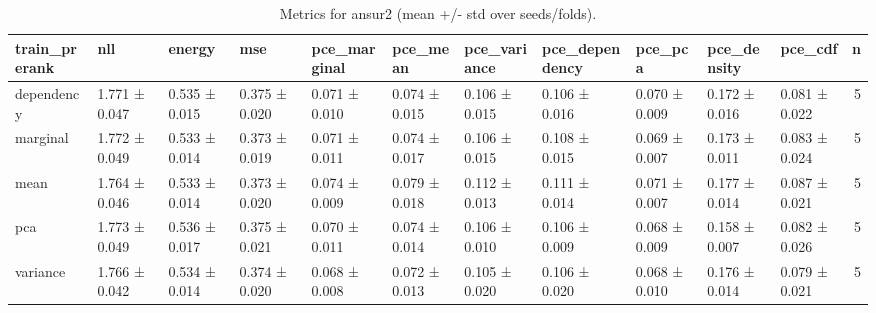 \begin{table}
\caption{Metrics for ansur2 (mean +/- std over seeds/folds).}
\label{tab:metrics_summary_ansur2}
\begin{tabular}{lllllllllllr}
\toprule
train_prerank & nll & energy & mse & pce_marginal & pce_mean & pce_variance & pce_dependency & pce_pca & pce_density & pce_cdf & n \\
\midrule
dependency & 1.771 ± 0.047 & 0.535 ± 0.015 & 0.375 ± 0.020 & 0.071 ± 0.010 & 0.074 ± 0.015 & 0.106 ± 0.015 & 0.106 ± 0.016 & 0.070 ± 0.009 & 0.172 ± 0.016 & 0.081 ± 0.022 & 5 \\
marginal & 1.772 ± 0.049 & 0.533 ± 0.014 & 0.373 ± 0.019 & 0.071 ± 0.011 & 0.074 ± 0.017 & 0.106 ± 0.015 & 0.108 ± 0.015 & 0.069 ± 0.007 & 0.173 ± 0.011 & 0.083 ± 0.024 & 5 \\
mean & 1.764 ± 0.046 & 0.533 ± 0.014 & 0.373 ± 0.020 & 0.074 ± 0.009 & 0.079 ± 0.018 & 0.112 ± 0.013 & 0.111 ± 0.014 & 0.071 ± 0.007 & 0.177 ± 0.014 & 0.087 ± 0.021 & 5 \\
pca & 1.773 ± 0.049 & 0.536 ± 0.017 & 0.375 ± 0.021 & 0.070 ± 0.011 & 0.074 ± 0.014 & 0.106 ± 0.010 & 0.106 ± 0.009 & 0.068 ± 0.009 & 0.158 ± 0.007 & 0.082 ± 0.026 & 5 \\
variance & 1.766 ± 0.042 & 0.534 ± 0.014 & 0.374 ± 0.020 & 0.068 ± 0.008 & 0.072 ± 0.013 & 0.105 ± 0.020 & 0.106 ± 0.020 & 0.068 ± 0.010 & 0.176 ± 0.014 & 0.079 ± 0.021 & 5 \\
\bottomrule
\end{tabular}
\end{table}

